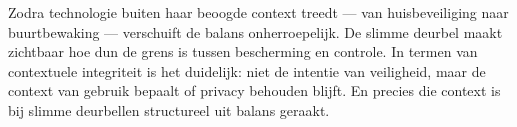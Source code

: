 \documentclass[nonacm, sigconf, balance=true]{acmart}
\begin{document}
    Zodra technologie buiten haar beoogde context treedt — van huisbeveiliging naar buurtbewaking — verschuift de balans onherroepelijk.
    De slimme deurbel maakt zichtbaar hoe dun de grens is tussen bescherming en controle.
    In termen van contextuele integriteit is het duidelijk: niet de intentie van veiligheid, maar de context van gebruik bepaalt of privacy behouden blijft.
    En precies die context is bij slimme deurbellen structureel uit balans geraakt.
\end{document}
